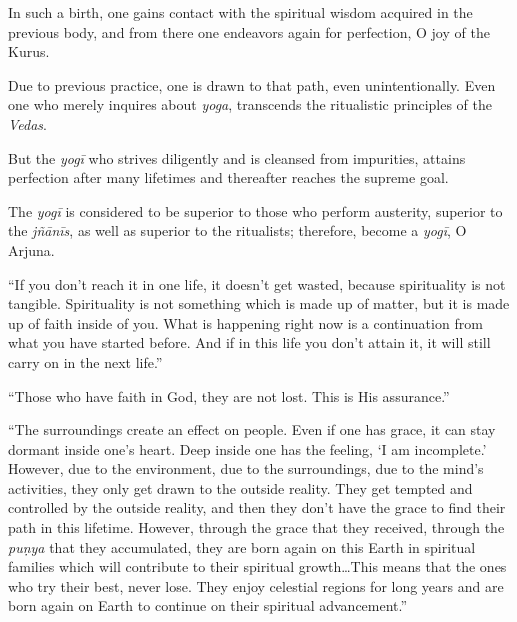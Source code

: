 {In such a birth, one gains contact with the spiritual wisdom acquired in the previous body, and from there one endeavors again for perfection, O joy of the Kurus.}

{Due to previous practice, one is drawn to that path, even unintentionally. Even one who merely inquires about \textit{yoga}, transcends the ritualistic principles of the \textit{Vedas}.}

{But the \textit{yogī} who strives diligently and is cleansed from impurities, attains perfection after many lifetimes and thereafter reaches the supreme goal.}

{The \textit{yogī} is considered to be superior to those who perform austerity, superior to the \textit{jñānīs}, as well as superior to the ritualists; therefore, become a \textit{yogī}, O Arjuna.}

\enquote{If you don’t reach it in one life, it doesn’t get wasted, because spirituality is not tangible. Spirituality is not something which is made up of matter, but it is made up of faith inside of you. What is happening right now is a continuation from what you have started before. And if in this life you don’t attain it, it will still carry on in the next life.}

\enquote{Those who have faith in God, they are not lost. This is His assurance.}

\enquote{The surroundings create an effect on people. Even if one has grace, it can stay dormant inside one’s heart. Deep inside one has the feeling, \enquote{I am incomplete.} However, due to the environment, due to the surroundings, due to the mind’s activities, they only get drawn to the outside reality. They get tempted and controlled by the outside reality, and then they don’t have the grace to find their path in this lifetime. However, through the grace that they received, through the \textit{puṇya} that they accumulated, they are born again on this Earth in spiritual families which will contribute to their spiritual growth\ldots This means that the ones who try their best, never lose. They enjoy celestial regions for long years and are born again on Earth to continue on their spiritual advancement.}

